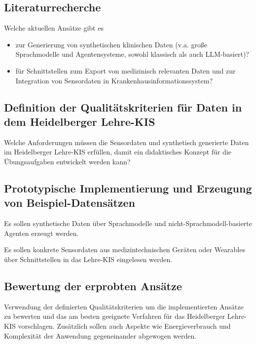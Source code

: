 \subsection{Literaturrecherche}
Welche aktuellen Ansätze gibt es 
\begin{itemize}
    \item zur Generierung von synthetischen klinischen Daten (v.a. große Sprachmodelle und Agentensysteme, sowohl klassisch als auch LLM-basiert)?
    \item für Schnittstellen zum Export von medizinisch relevanten Daten und zur Integration von Sensordaten in Krankenhausinformationssystem? 
\end{itemize}

\subsection{Definition der Qualitätskriterien für Daten in dem Heidelberger Lehre-KIS}
Welche Anforderungen müssen die Sensordaten und synthetisch generierte Daten im Heidelberger Lehre-KIS erfüllen, damit ein didaktisches Konzept für die Übungsaufgaben entwickelt werden kann?

\subsection{Prototypische Implementierung und Erzeugung von Beispiel-Datensätzen}
Es sollen synthetische Daten über Sprachmodelle und nicht-Sprachmodell-basierte Agenten erzeugt werden.

Es sollen konkrete Sensordaten aus medizintechnischen Geräten oder Wearables über Schnittstellen in das Lehre-KIS eingelesen werden.

\subsection{Bewertung der erprobten Ansätze}
Verwendung der definierten Qualitätskriterien um die implementierten Ansätze zu bewerten und das am besten geeignete Verfahren für das Heidelberger Lehre-KIS vorschlagen. Zusätzlich sollen auch Aspekte wie Energieverbrauch und Komplexität der Anwendung gegeneinander abgewogen werden.